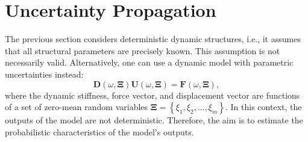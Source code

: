 %
%

\section{Uncertainty Propagation}
\label{sec: stochastic}

The previous section considers deterministic dynamic structures, i.e., it assumes that all structural parameters are precisely known.
This assumption is not necessarily valid.
{Alternatively, one can use a dynamic model with parametric uncertainties instead:}%
\begin{equation}
    \mathbf{D} \left(\omega, \mathbf{\Xi}\right)
    \mathbf{U} \left(\omega, \mathbf{\Xi}\right)
    =
    \mathbf{F} \left(\omega, \mathbf{\Xi}\right),
    \label{stochastic_eq_of_motion}
\end{equation}
where the dynamic stiffness, force vector, and displacement vector are functions of a set of zero-mean random variables $\mathbf{\Xi}=\left\{\xi_{1}, \xi_{2},...,\xi_{m}\right\}$.
In this context, the outputs of the model are not deterministic.
Therefore, the aim is to estimate the probabilistic characteristics of the model's outputs.




